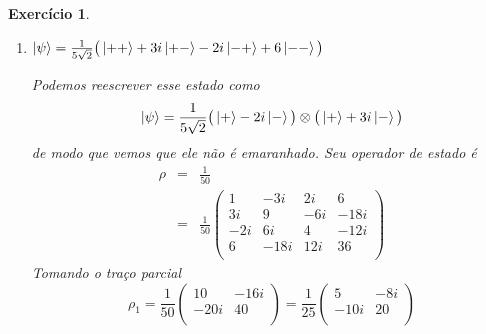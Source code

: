 \documentclass[12pt]{article}
\def\be{\begin{equation}}
\def\ee{\end{equation}}
\def\bea{\begin{eqnarray*}}
\def\eea{\end{eqnarray*}}
\def\f{\frac}
\newtheorem{exercise}{Exercício}
\begin{document}
\begin{exercise}
\begin{enumerate}
			\item $ \ket{\psi} = \f{1}{5\sqrt{2}} \big( \ket{++} + 3i\ket{+-} - 2i\ket{-+} + 6\ket{--} \big) $
			\begin{multianswer}[true]
				Podemos reescrever esse estado como
				\be
					\ket{\psi} = \f{1}{5\sqrt{2}} \big( \ket{+} - 2i\ket{-}\big) \otimes \big( \ket{+} + 3i \ket{-}\big) 
				\ee
				de modo que vemos que ele não é emaranhado. Seu operador de estado é
				\bea
					\rho &=& \f{1}{50}   \\
						&=&  \frac{1}{50} 
					\begin{pmatrix}
						1 & -3i & 2i & 6 \\
						3i & 9 & -6i & -18i \\
						-2i & 6i & 4 & -12i \\
						6 & -18i & 12i & 36 \\
					\end{pmatrix}					
				\eea
				Tomando o traço parcial
				\be
					\rho_1 = \f{1}{50} 
					\begin{pmatrix}
						10 & -16i \\
						-20i & 40 \\
					\end{pmatrix} 
					= \f{1}{25} 
					\begin{pmatrix}
						5 & -8i \\
						-10i & 20 \\
					\end{pmatrix} 
				\ee
			\end{multianswer}
		\end{enumerate}
	\end{exercise}
	
\end{document}
